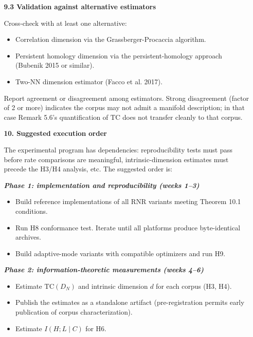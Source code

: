 \documentclass[
]{article}
\begin{document}
\textbf{9.3 Validation against alternative estimators}

Cross-check with at least one alternative:

\begin{itemize}
\item
  Correlation dimension via the Grassberger-Procaccia algorithm.
\item
  Persistent homology dimension via the persistent-homology approach
  (Bubenik 2015 or similar).
\item
  Two-NN dimension estimator (Facco et al. 2017).
\end{itemize}

Report agreement or disagreement among estimators. Strong
disagreement (factor of 2 or more) indicates the corpus may not
admit a manifold description; in that case Remark 5.6's
quantification of $\mathrm{TC}$ does not transfer cleanly to that
corpus.

\textbf{10. Suggested execution order}

The experimental program has dependencies: reproducibility tests must
pass before rate comparisons are meaningful, intrinsic-dimension
estimates must precede the H3/H4 analysis, etc. The suggested order is:

\emph{\textbf{Phase 1: implementation and reproducibility (weeks 1--3)}}

\begin{itemize}
\item
  Build reference implementations of all RNR variants meeting Theorem
  10.1 conditions.
\item
  Run H8 conformance test. Iterate until all platforms produce
  byte-identical archives.
\item
  Build adaptive-mode variants with compatible optimizers and run H9.
\end{itemize}

\emph{\textbf{Phase 2: information-theoretic measurements (weeks 4--6)}}

\begin{itemize}
\item
  Estimate $\mathrm{TC}(D_N)$ and intrinsic dimension $d$ for each
  corpus (H3, H4).
\item
  Publish the estimates as a standalone artifact (pre-registration
  permits early publication of corpus characterization).
\item
  Estimate $I(H ; L \mid C)$ for H6.
\end{itemize}
\end{document}
